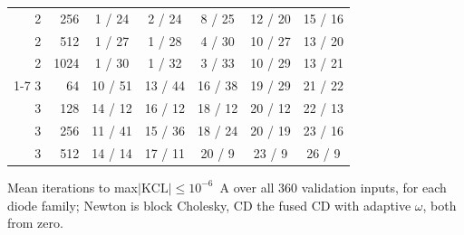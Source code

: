 \documentclass[11pt,a4paper]{article}
\begin{document}
\begin{center}
\begin{tabular}{rr|ccccc}
2 & 256 & 1 / 24 & 2 / 24 & 8 / 25 & 12 / 20 & 15 / 16 \\
2 & 512 & 1 / 27 & 1 / 28 & 4 / 30 & 10 / 27 & 13 / 20 \\
2 & 1024 & 1 / 30 & 1 / 32 & 3 / 33 & 10 / 29 & 13 / 21 \\
\cline{1-7}
3 & 64 & 10 / 51 & 13 / 44 & 16 / 38 & 19 / 29 & 21 / 22 \\
3 & 128 & 14 / 12 & 16 / 12 & 18 / 12 & 20 / 12 & 22 / 13 \\
3 & 256 & 11 / 41 & 15 / 36 & 18 / 24 & 20 / 19 & 23 / 16 \\
3 & 512 & 14 / 14 & 17 / 11 & 20 / 9 & 23 / 9 & 26 / 9 \\
\end{tabular}

\smallskip
Mean iterations to max$|\mathrm{KCL}| \le 10^{-6}$~A over all 360
validation inputs, for each diode family; Newton is
block Cholesky, CD the fused CD with adaptive $\omega$, both from zero.
\end{center}
\end{document}
